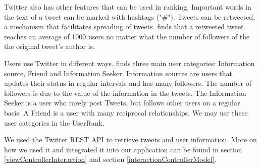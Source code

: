 
Twitter also has other features that can be used in ranking. Important words in the text of a tweet can be marked with hashtags ("\#"). Tweets can be retweeted, a mechanism that facilitates spreading of tweets. \citep{Kwak2010} finds that a retweeted tweet reaches an average of 1000 users no matter what the number of followers of the  the original tweet's author is.


Users use Twitter in different ways. \citet{Akshay2007} finds three main user categories: Information source, Friend and Information Seeker. Information sources are users that updates their status in regular intervals and has many followers. The number of followers is due to the value of the information in the tweets. The Information Seeker is a user who rarely post Tweets, but follows other users on a regular basis. A Friend is a user with many reciprocal relationships. We may use these user categories in the UserRank.

We used the Twitter REST API to retrieve tweets and user information. More on how we used it and integrated it into our application can be found in section \ref{viewControllerInteraction} and section \ref{interactionControllerModel}. 

